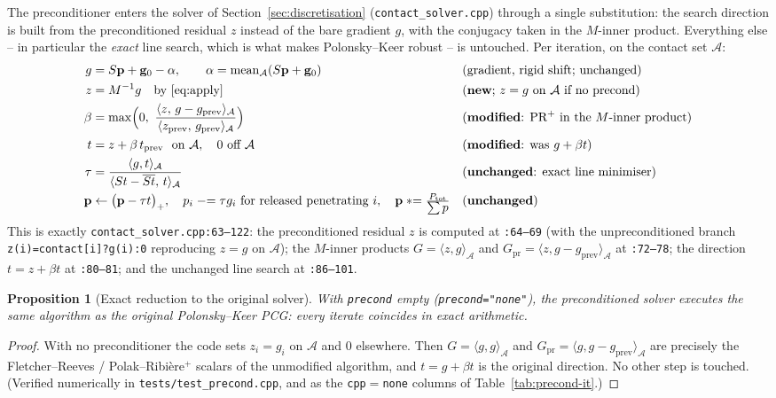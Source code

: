 \documentclass[11pt,a4paper]{article}
\newcommand{\pp}{\mathbf{p}}
\newcommand{\code}[1]{\texttt{#1}}
\newtheorem{proposition}{Proposition}
\theoremstyle{definition}
\theoremstyle{remark}
\begin{document}
The preconditioner enters the solver of Section~\ref{sec:discretisation}
(\code{contact\_solver.cpp}) through a single substitution: the search direction
is built from the preconditioned residual $z$ instead of the bare gradient $g$,
with the conjugacy taken in the $M$-inner product. Everything else -- in
particular the \emph{exact} line search, which is what makes Polonsky--Keer robust
-- is untouched. Per iteration, on the contact set $\mathcal A$:
\begin{align}
  g &= S\pp + \mathbf g_0 - \alpha, \qquad
     \alpha=\operatorname{mean}_{\mathcal A}(S\pp+\mathbf g_0)
     &&\text{(gradient, rigid shift; unchanged)}\notag\\
  z &= M^{-1} g \quad\text{by \eqref{eq:apply}}
     &&\text{(\textbf{new}; $z=g$ on $\mathcal A$ if no precond)}\notag\\
  \beta &= \max\!\Big(0,\ \frac{\langle z,\,g-g_{\text{prev}}\rangle_{\mathcal A}}
                              {\langle z_{\text{prev}},\,g_{\text{prev}}\rangle_{\mathcal A}}\Big)
     &&\text{(\textbf{modified}: PR$^+$ in the $M$-inner product)}\notag\\
  t &= z + \beta\, t_{\text{prev}} \ \ \text{on }\mathcal A,\quad 0\text{ off }\mathcal A
     &&\text{(\textbf{modified}: was $g+\beta t$)}\notag\\
  \tau &= \frac{\langle g,t\rangle_{\mathcal A}}
              {\langle St-\overline{St},\,t\rangle_{\mathcal A}}
     &&\text{(\textbf{unchanged}: exact line minimiser)}\notag\\
  \pp &\leftarrow \big(\pp-\tau t\big)_+,\quad
       p_i \mathrel{-}=\tau g_i\ \text{for released penetrating }i,\quad
       \pp \mathrel{*}= \tfrac{P_{\text{tot}}}{\textstyle\sum p}
     &&\text{(\textbf{unchanged})}\notag
\end{align}
This is exactly \code{contact\_solver.cpp:63--122}: the preconditioned residual
$z$ is computed at \code{:64--69} (with the unpreconditioned branch
\code{z(i)=contact[i]?g(i):0} reproducing $z=g$ on $\mathcal A$); the $M$-inner
products $G=\langle z,g\rangle_{\mathcal A}$ and
$G_{\text{pr}}=\langle z,g-g_{\text{prev}}\rangle_{\mathcal A}$ at \code{:72--78};
the direction $t=z+\beta t$ at \code{:80--81}; and the unchanged line search at
\code{:86--101}.

\begin{proposition}[Exact reduction to the original solver]
\label{prop:precond-none}
With \code{precond} empty (\code{precond="none"}), the preconditioned solver
executes the \emph{same algorithm} as the original Polonsky--Keer PCG: every
iterate coincides in exact arithmetic.
\end{proposition}
\begin{proof}
With no preconditioner the code sets $z_i=g_i$ on $\mathcal A$ and $0$ elsewhere.
Then $G=\langle g,g\rangle_{\mathcal A}$ and
$G_{\text{pr}}=\langle g,g-g_{\text{prev}}\rangle_{\mathcal A}$ are precisely the
Fletcher--Reeves / Polak--Ribière$^+$ scalars of the unmodified algorithm, and
$t=g+\beta t$ is the original direction. No other step is touched. (Verified
numerically in \code{tests/test\_precond.cpp}, and as the
\code{cpp}$=$\code{none} columns of Table~\ref{tab:precond-it}.)
\end{proof}
\end{document}
